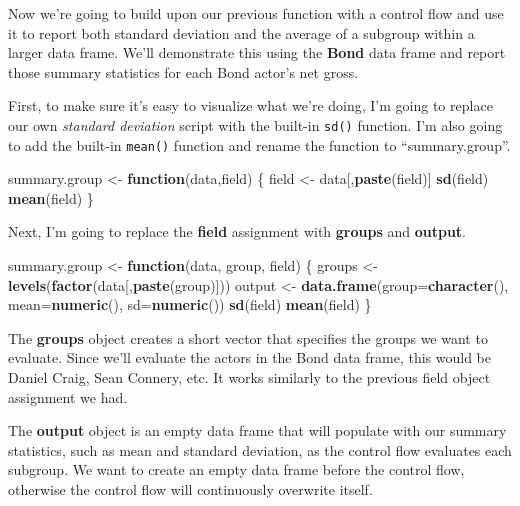 \documentclass[
]{book}
\newenvironment{Shaded}{\begin{snugshade}}{\end{snugshade}}
\newcommand{\ControlFlowTok}[1]{\textcolor[rgb]{0.13,0.29,0.53}{\textbf{#1}}}
\newcommand{\DataTypeTok}[1]{\textcolor[rgb]{0.13,0.29,0.53}{#1}}
\newcommand{\KeywordTok}[1]{\textcolor[rgb]{0.13,0.29,0.53}{\textbf{#1}}}
\newcommand{\NormalTok}[1]{#1}
\newcommand{\StringTok}[1]{\textcolor[rgb]{0.31,0.60,0.02}{#1}}
\begin{document}
\begin{center}
Now we're going to build upon our previous function with a control flow and use it to report both standard deviation and the average of a subgroup within a larger data frame. We'll demonstrate this using the \textbf{Bond} data frame and report those summary statistics for each Bond actor's net gross.

First, to make sure it's easy to visualize what we're doing, I'm going to replace our own \emph{standard deviation} script with the built-in \texttt{sd()} function. I'm also going to add the built-in \texttt{mean()} function and rename the function to ``summary.group''.

\begin{Shaded}
\begin{Highlighting}[]
\NormalTok{summary.group <-}\StringTok{ }\ControlFlowTok{function}\NormalTok{(data,field) \{}
\NormalTok{  field <-}\StringTok{ }\NormalTok{data[,}\KeywordTok{paste}\NormalTok{(field)]}
  \KeywordTok{sd}\NormalTok{(field)}
  \KeywordTok{mean}\NormalTok{(field)}
\NormalTok{\}}
\end{Highlighting}
\end{Shaded}

Next, I'm going to replace the \textbf{field} assignment with \textbf{groups} and \textbf{output}.

\begin{Shaded}
\begin{Highlighting}[]
\NormalTok{summary.group <-}\StringTok{ }\ControlFlowTok{function}\NormalTok{(data, group, field) \{}
\NormalTok{  groups <-}\StringTok{ }\KeywordTok{levels}\NormalTok{(}\KeywordTok{factor}\NormalTok{(data[,}\KeywordTok{paste}\NormalTok{(group)]))}
\NormalTok{  output <-}\StringTok{ }\KeywordTok{data.frame}\NormalTok{(}\DataTypeTok{group=}\KeywordTok{character}\NormalTok{(),}
                       \DataTypeTok{mean=}\KeywordTok{numeric}\NormalTok{(),}
                       \DataTypeTok{sd=}\KeywordTok{numeric}\NormalTok{())}
  \KeywordTok{sd}\NormalTok{(field)}
  \KeywordTok{mean}\NormalTok{(field)}
\NormalTok{\}}
\end{Highlighting}
\end{Shaded}

The \textbf{groups} object creates a short vector that specifies the groups we want to evaluate. Since we'll evaluate the actors in the Bond data frame, this would be Daniel Craig, Sean Connery, etc. It works similarly to the previous field object assignment we had.

The \textbf{output} object is an empty data frame that will populate with our summary statistics, such as mean and standard deviation, as the control flow evaluates each subgroup. We want to create an empty data frame before the control flow, otherwise the control flow will continuously overwrite itself.


\end{center}
\end{document}
